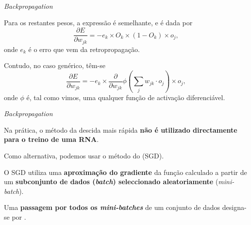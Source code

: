 \begin{frame}{\textit{Backpropagation} \cont}

Para os restantes pesos, a expressão é semelhante, e é dada por 
\begin{equation}
    \frac{\partial E}{\partial w_{jk}} = -e_k \times O_k \times (1-O_k) \times o_j,
\end{equation}
onde $e_k$ é o erro que vem da retropropagação. 

\pauseskip

Contudo, no caso genérico, têm-se
\begin{equation}
	\frac{\partial E}{\partial w_{jk}} = -e_k \times \frac{\partial}{\partial w_{jk}}\phi\left(\sum_j  w_{jk} \cdot o_{j}\right)\times o_j,
\end{equation}
onde $\phi$ é, tal como vimos, uma qualquer função de activação diferenciável.  

\end{frame}

\begin{frame}{\textit{Backpropagation} \cont}
    
    Na prática, o método da descida mais rápida \textbf{não é utilizado directamente para o treino de uma RNA}.
    
    \pauseskip
    
    Como alternativa, podemos usar o método do  (SGD). 
    
    \pauseskip
    
    O SGD utiliza uma \textbf{aproximação do gradiente} da função calculado a partir de um \textbf{subconjunto de dados (\textit{batch}) seleccionado aleatoriamente} (\textit{mini-batch}).
    
    \pauseskip
    
    Uma \textbf{passagem por todos os \textit{mini-batches}} de um conjunto de dados designa-se por .
    
\end{frame}

